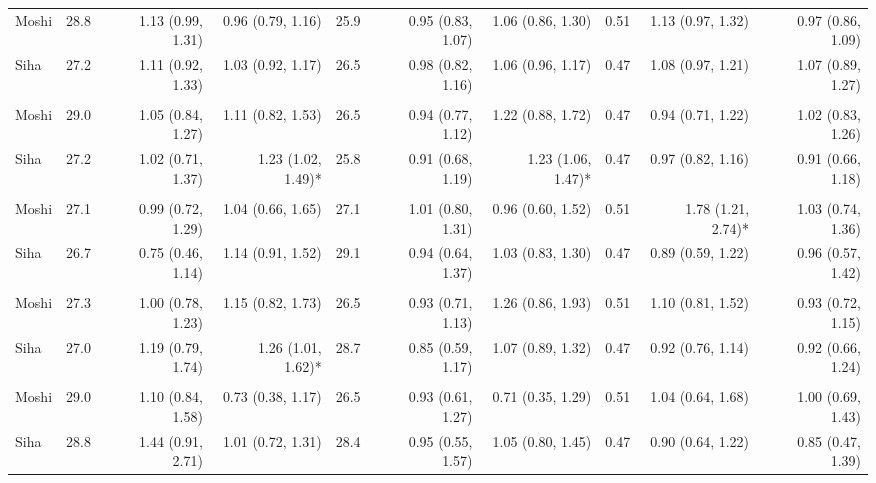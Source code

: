 \begin{table}[t]
\begin{tabular*}{\linewidth}{@{\extracolsep{\fill}}l|rrrrrrrrr}
\midrule\addlinespace[2.5pt]
\multicolumn{10}{l}{Peptic Ulcers} \\[2.5pt] 
\midrule\addlinespace[2.5pt]
Moshi & 28.8 & 1.13 (0.99, 1.31)  & 0.96 (0.79, 1.16)  & 25.9 & 0.95 (0.83, 1.07)  & 1.06 (0.86, 1.30)  & 0.51 & 1.13 (0.97, 1.32)  & 0.97 (0.86, 1.09)  \\ 
Siha & 27.2 & 1.11 (0.92, 1.33)  & 1.03 (0.92, 1.17)  & 26.5 & 0.98 (0.82, 1.16)  & 1.06 (0.96, 1.17)  & 0.47 & 1.08 (0.97, 1.21)  & 1.07 (0.89, 1.27)  \\ 
\midrule\addlinespace[2.5pt]
\multicolumn{10}{l}{Epilepsy} \\[2.5pt] 
\midrule\addlinespace[2.5pt]
Moshi & 29.0 & 1.05 (0.84, 1.27)  & 1.11 (0.82, 1.53)  & 26.5 & 0.94 (0.77, 1.12)  & 1.22 (0.88, 1.72)  & 0.47 & 0.94 (0.71, 1.22)  & 1.02 (0.83, 1.26)  \\ 
Siha & 27.2 & 1.02 (0.71, 1.37)  & 1.23 (1.02, 1.49)* & 25.8 & 0.91 (0.68, 1.19)  & 1.23 (1.06, 1.47)* & 0.47 & 0.97 (0.82, 1.16)  & 0.91 (0.66, 1.18)  \\ 
\midrule\addlinespace[2.5pt]
\multicolumn{10}{l}{Neuroses} \\[2.5pt] 
\midrule\addlinespace[2.5pt]
Moshi & 27.1 & 0.99 (0.72, 1.29)  & 1.04 (0.66, 1.65)  & 27.1 & 1.01 (0.80, 1.31)  & 0.96 (0.60, 1.52)  & 0.51 & 1.78 (1.21, 2.74)* & 1.03 (0.74, 1.36)  \\ 
Siha & 26.7 & 0.75 (0.46, 1.14)  & 1.14 (0.91, 1.52)  & 29.1 & 0.94 (0.64, 1.37)  & 1.03 (0.83, 1.30)  & 0.47 & 0.89 (0.59, 1.22)  & 0.96 (0.57, 1.42)  \\ 
\midrule\addlinespace[2.5pt]
\multicolumn{10}{l}{Psychoses} \\[2.5pt] 
\midrule\addlinespace[2.5pt]
Moshi & 27.3 & 1.00 (0.78, 1.23)  & 1.15 (0.82, 1.73)  & 26.5 & 0.93 (0.71, 1.13)  & 1.26 (0.86, 1.93)  & 0.51 & 1.10 (0.81, 1.52)  & 0.93 (0.72, 1.15)  \\ 
Siha & 27.0 & 1.19 (0.79, 1.74)  & 1.26 (1.01, 1.62)* & 28.7 & 0.85 (0.59, 1.17)  & 1.07 (0.89, 1.32)  & 0.47 & 0.92 (0.76, 1.14)  & 0.92 (0.66, 1.24)  \\ 
\midrule\addlinespace[2.5pt]
\multicolumn{10}{l}{Dysentery} \\[2.5pt] 
\midrule\addlinespace[2.5pt]
Moshi & 29.0 & 1.10 (0.84, 1.58)  & 0.73 (0.38, 1.17)  & 26.5 & 0.93 (0.61, 1.27)  & 0.71 (0.35, 1.29)  & 0.51 & 1.04 (0.64, 1.68)  & 1.00 (0.69, 1.43)  \\ 
Siha & 28.8 & 1.44 (0.91, 2.71)  & 1.01 (0.72, 1.31)  & 28.4 & 0.95 (0.55, 1.57)  & 1.05 (0.80, 1.45)  & 0.47 & 0.90 (0.64, 1.22)  & 0.85 (0.47, 1.39)  \\ 

\end{tabular*}
\end{table}
